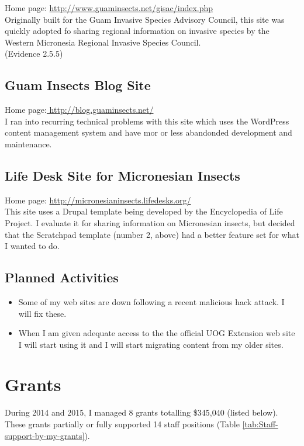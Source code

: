 \documentclass[12pt,oneside,english]{scrbook}
\begin{document}
Home page: \url{http://www.guaminsects.net/gisac/index.php}\\
Originally built for the Guam Invasive Species Advisory Council, this
site was quickly adopted fo sharing regional information on invasive
species by the Western Micronesia Regional Invasive Species Council.\\
(Evidence 2.5.5)

\subsection{Guam Insects Blog Site}

Home page:\url{ http://blog.guaminsects.net/} \\
I ran into recurring technical problems with this site which uses
the WordPress content management system and have mor or less abandonded
development and maintenance.

\subsection{Life Desk Site for Micronesian Insects}

Home page: \url{http://micronesianinsects.lifedesks.org/}\\
This site uses a Drupal template being developed by the Encyclopedia
of Life Project. I evaluate it for sharing information on Micronesian
insects, but decided that the Scratchpad template (number 2, above)
had a better feature set for what I wanted to do.

\subsection{Planned Activities}
\begin{itemize}
\item Some of my web sites are down following a recent malicious hack attack. I will fix these.
\item When I am given adequate access to the the official UOG Extension web site I will start using it and I will start migrating content from my older sites.
\end{itemize}

\section{Grants}
\label{grants}

During 2014 and 2015, I managed 8 grants totalling \$345,040 (listed below). These grants partially or fully supported 14 staff positions (Table \ref{tab:Staff-support-by-my-grants}).
\end{document}
